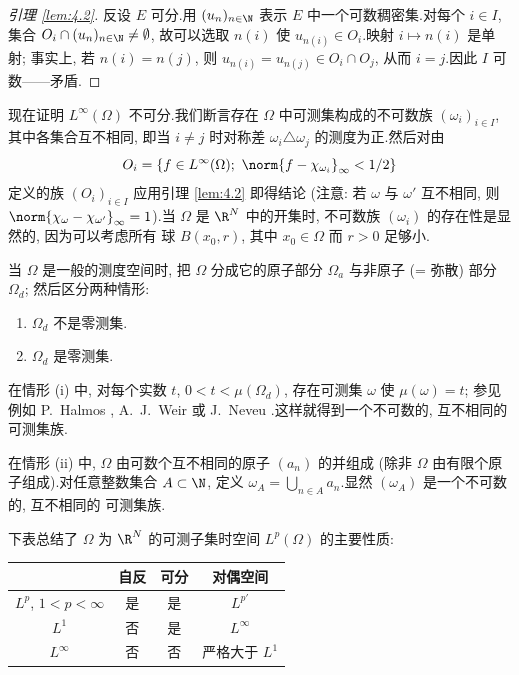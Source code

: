 \begin{proof}[引理 \ref{lem:4.2}]
反设 $E$ 可分.用 $(u_n)_{n\in\N}$ 表示 $E$ 中一个可数稠密集.对每个
$i\in I$, 集合 $O_i\cap(u_n)_{n\in\N}\ne\emptyset$, 故可以选取 $n(i)$ 使
$u_{n(i)}\in O_i$.映射 $i\mapsto n(i)$ 是单射; 事实上, 若 $n(i)=n(j)$, 则
$u_{n(i)}=u_{n(j)}\in O_i\cap O_j$, 从而 $i=j$.因此 $I$ 可数——矛盾.
\end{proof}

现在证明 $L^\infty(\Omega)$ 不可分.我们断言存在 $\Omega$ 中可测集构成的不可数族
$(\omega_i)_{i\in I}$, 其中各集合互不相同, 即当 $i\ne j$ 时对称差
$\omega_i\triangle\omega_j$ 的测度为正.然后对由
\begin{equation*}
O_i=\{f\in L^\infty(\Omega);\ \norm{f-\chi_{\omega_i}}_\infty<1/2\}
\end{equation*}
定义的族 $(O_i)_{i\in I}$ 应用引理  \ref{lem:4.2} 即得结论 (注意: 若 $\omega$ 与
$\omega'$ 互不相同, 则 $\norm{\chi_\omega-\chi_{\omega'}}_\infty=1$).当 $\Omega$
是 $\R^N$ 中的开集时, 不可数族 $(\omega_i)$ 的存在性是显然的, 因为可以考虑所有
球 $B(x_0,r)$, 其中 $x_0\in\Omega$ 而 $r>0$ 足够小.

当 $\Omega$ 是一般的测度空间时, 把 $\Omega$ 分成它的原子部分 $\Omega_a$ 与非原子
(= 弥散) 部分 $\Omega_d$; 然后区分两种情形:
\begin{enumerate}[label=(\roman*), leftmargin=2.4em, itemsep=0.1em]
	\item $\Omega_d$ 不是零测集.
	\item $\Omega_d$ 是零测集.
\end{enumerate}
在情形 (i) 中, 对每个实数 $t$, $0<t<\mu(\Omega_d)$, 存在可测集 $\omega$ 使
$\mu(\omega)=t$; 参见例如 P.~Halmos , A.~J.~Weir 
或 J.~Neveu .这样就得到一个不可数的, 互不相同的可测集族.

在情形 (ii) 中, $\Omega$ 由可数个互不相同的原子 $(a_n)$ 的并组成 (除非 $\Omega$
由有限个原子组成).对任意整数集合 $A\subset\N$, 定义
$\omega_A=\bigcup_{n\in A}a_n$.显然 $(\omega_A)$ 是一个不可数的, 互不相同的
可测集族.

下表总结了 $\Omega$ 为 $\R^N$ 的可测子集时空间 $L^p(\Omega)$ 的主要性质:

\begin{center}
\renewcommand{\arraystretch}{1.35}
\begin{tabular}{|c|c|c|c|}
\hline
 & 自反 & 可分 & 对偶空间 \\
\hline
$L^p$, $1<p<\infty$ & 是 & 是 & $L^{p'}$ \\
\hline
$L^1$ & 否 & 是 & $L^\infty$ \\
\hline
$L^\infty$ & 否 & 否 & 严格大于 $L^1$ \\
\hline
\end{tabular}
\end{center}

